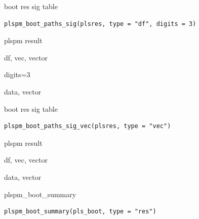 \documentclass[a4paper]{book}
\begin{document}
%
\begin{Description}
boot res sig table
\end{Description}
%
\begin{Usage}
\begin{verbatim}
plspm_boot_paths_sig(plsres, type = "df", digits = 3)
\end{verbatim}
\end{Usage}
%
\begin{Arguments}
\begin{ldescription}
\item[\code{plsres}] plspm result

\item[\code{type}] df, vec, vector

\item[\code{digits}] digits=3
\end{ldescription}
\end{Arguments}
%
\begin{Value}
data, vector
\end{Value}
%
\begin{Description}
boot res sig table
\end{Description}
%
\begin{Usage}
\begin{verbatim}
plspm_boot_paths_sig_vec(plsres, type = "vec")
\end{verbatim}
\end{Usage}
%
\begin{Arguments}
\begin{ldescription}
\item[\code{plsres}] plspm result

\item[\code{type}] df, vec, vector
\end{ldescription}
\end{Arguments}
%
\begin{Value}
data, vector
\end{Value}
%
\begin{Description}
plspm\_boot\_summary
\end{Description}
%
\begin{Usage}
\begin{verbatim}
plspm_boot_summary(pls_boot, type = "res")
\end{verbatim}
\end{Usage}
\end{document}
